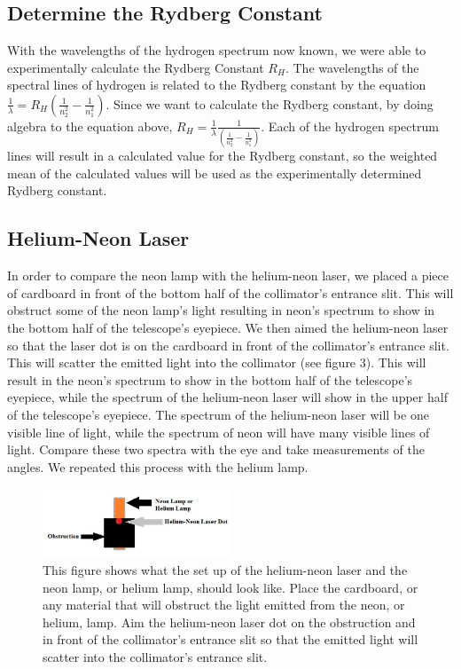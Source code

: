 \documentclass[a4paper]{article}
\begin{document}
\subsection{Determine the Rydberg Constant}
With the wavelengths of the hydrogen spectrum now known, we were able to experimentally calculate the Rydberg Constant $R_H$. The wavelengths of the spectral lines of hydrogen is related to the Rydberg constant by the equation $\frac{1}{\lambda}  = R_H( \frac{1}{n_2 ^2}-\frac{1}{n_1 ^2} )$. Since we want to calculate the Rydberg constant, by doing algebra to the equation above, $R_H = \frac{1}{\lambda}\frac{1}{( \frac{1}{n_2 ^2}-\frac{1}{n_1 ^2})}$. Each of the hydrogen spectrum lines will result in a calculated value for the Rydberg constant, so the weighted mean of the calculated values will be used as the experimentally determined Rydberg constant.
\subsection{Helium-Neon Laser}
In order to compare the neon lamp with the helium-neon laser, we placed a piece of cardboard in front of the bottom half of the collimator’s entrance slit. This will obstruct some of the neon lamp's light resulting in neon's spectrum to show in the bottom half of the telescope's eyepiece. We then aimed the helium-neon laser so that the laser dot is on the cardboard in front of the collimator’s entrance slit. This will scatter the emitted light into the collimator (see figure 3). This will result in the neon's spectrum to show in the bottom half of the telescope's eyepiece, while the spectrum of the helium-neon laser will show in the upper half of the telescope's eyepiece. The spectrum of the helium-neon laser will be one visible line of light, while the spectrum of neon will have many visible lines of light. Compare these two spectra with the eye and take measurements of the angles. We repeated this process with the helium lamp.
\begin{figure}[h]
\centering
\includegraphics[width=0.5\textwidth]{3}
\caption{This figure shows what the set up of the helium-neon laser and the neon lamp, or helium lamp, should look like. Place the cardboard, or any material that will obstruct the light emitted from the neon, or helium, lamp. Aim the helium-neon laser dot on the obstruction and in front of the collimator’s entrance slit so that the emitted light will scatter into the collimator’s entrance slit.}
\end{figure}
\end{document}
